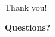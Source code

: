 \begin{frame}{Thank you!}
  \centering
  \vfill
  {\Huge\bfseries\color{MendingTeal}Questions?\par}
  \vfill
\end{frame}
